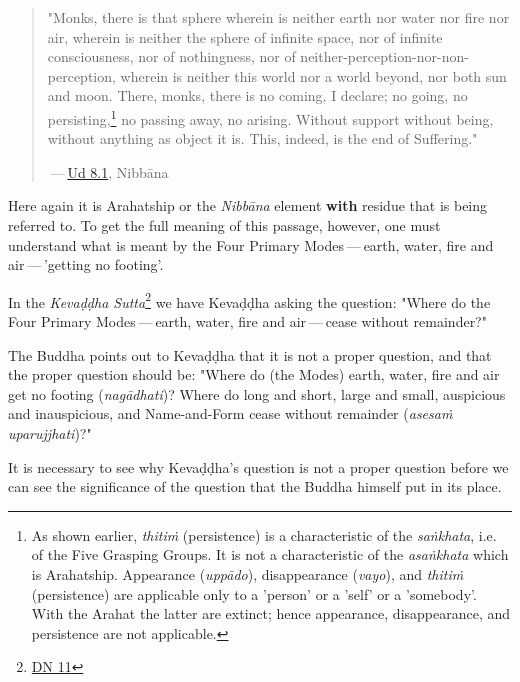 \begin{quotation}
"Monks, there is that sphere wherein is neither
earth nor water nor fire nor air, wherein is neither the sphere of
infinite space, nor of infinite consciousness, nor of nothingness, nor
of neither-perception-nor-non-perception, wherein is neither this world
nor a world beyond, nor both sun and moon. There, monks, there is no
coming, I declare; no going, no persisting,\footnote{As shown earlier, \emph{thitiṁ} (persistence) is a characteristic of the \emph{saṅkhata}, i.e. of the Five Grasping Groups. It is not a characteristic of the \emph{asaṅkhata} which is Arahatship. Appearance (\emph{uppādo}), disappearance (\emph{vayo}), and \emph{thitiṁ} (persistence) are applicable only to a 'person' or a 'self' or a 'somebody'. With the Arahat the latter are extinct; hence appearance, disappearance, and persistence are not applicable.} no
passing away, no arising. Without support without being, without
anything as object it is. This, indeed, is the end of
Suffering."


 — \href{https://suttacentral.net/ud8.1/en/anandajoti}{Ud 8.1}, Nibbāna


\end{quotation}

Here again it is Arahatship or the \emph{Nibbāna} element \textbf{with} residue that
is being referred to. To get the full meaning of this passage, however,
one must understand what is meant by the Four Primary Modes — earth,
water, fire and air — 'getting no footing'.


In the \emph{Kevaḍḍha Sutta}\footnote{\href{https://suttacentral.net/dn11/en/sujato}{DN 11}} we have Kevaḍḍha
asking the question: "Where do the Four Primary Modes — earth, water,
fire and air — cease without remainder?"


The Buddha points out to Kevaḍḍha that it is not a proper question, and
that the proper question should be: "Where do (the Modes) earth, water,
fire and air get no footing (\emph{nagādhati})? Where do long and short,
large and small, auspicious and inauspicious, and Name-and-Form cease
without remainder (\emph{asesaṁ uparujjhati})?"


It is necessary to see why Kevaḍḍha’s question is not a proper question
before we can see the significance of the question that the Buddha
himself put in its place.


